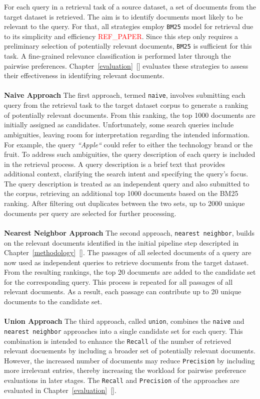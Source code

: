 For each query in a retrieval task of a source dataset, a set of documents from the target dataset is retrieved. The aim is to identify documents most likely to be relevant to the query. For that, all strategies employ \texttt{BM25} model for retrieval due to its simplicity and efficiency \textcolor{red}{REF\_PAPER}. Since this step only requires a preliminary selection of potentially relevant documents, \texttt{BM25} is sufficient for this task. A fine-grained relevance classification is performed later through the pairwise preferences. Chapter~\ref{evaluation}~[] evaluates these strategies to assess their effectiveness in identifying relevant documents.
\\\\
\textbf{Naive Approach}
The first approach, termed \texttt{naive}, involves submitting each query from the retrieval task to the target dataset corpus to generate a ranking of potentially relevant documents. From this ranking, the top 1000 documents are initially assigned as candidates. Unfortunately, some search queries include ambiguities, leaving room for interpretation regarding the intended information. For example, the query \textit{``Apple``} could refer to either the technology brand or the fruit. To address such ambiguities, the query description of each query is included in the retrieval process. A query description is a brief text that provides additional context, clarifying the search intent and specifying the query's focus. The query description is treated as an independent query and also submitted to the corpus, retrieving an additional top 1000 documents based on the BM25 ranking. After filtering out duplicates between the two sets, up to 2000 unique documents per query are selected for further processing.
\\\\
\textbf{Nearest Neighbor Approach}
The second approach, \texttt{nearest neighbor}, builds on the relevant documents identified in the initial pipeline step descripted in Chapter~\ref{methodology}~[]. The passages of all selected documents of a query are now used as independent queries to retrieve documents from the target dataset. From the resulting rankings, the top 20 documents are added to the candidate set for the corresponding query. This process is repeated for all passages of all relevant documents. As a result, each passage can contribute up to 20 unique documents to the candidate set.
\\\\
\textbf{Union Approach}
The third approach, called \texttt{union}, combines the \texttt{naive} and \texttt{nearest neighbor} approaches into a single candidate set for each query. This combination is intended to enhance the \texttt{Recall} of the number of retrieved relevant docuements by including a broader set of potentially relevant documents. However, the increased number of documents may reduce \texttt{Precision} by including more irrelevant entries, thereby increasing the workload for pairwise preference evaluations in later stages. The \texttt{Recall} and \texttt{Precision} of the approaches are evaluated in Chapter~\ref{evaluation}~[].

